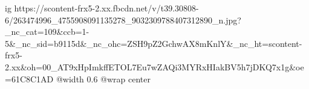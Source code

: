  
 
 
 
 

\ifcmt
  ig https://scontent-frx5-2.xx.fbcdn.net/v/t39.30808-6/263474996_4755908091135278_9032309788407312890_n.jpg?_nc_cat=109&ccb=1-5&_nc_sid=b9115d&_nc_ohc=ZSH9pZ2GchwAX8mKnlY&_nc_ht=scontent-frx5-2.xx&oh=00_AT9xHpImkffETOL7Eu7wZAQi3MYRxHIakBV5h7jDKQ7x1g&oe=61C8C1AD
  @width 0.6
	@wrap center
\fi

\begin{center}
\end{center}
